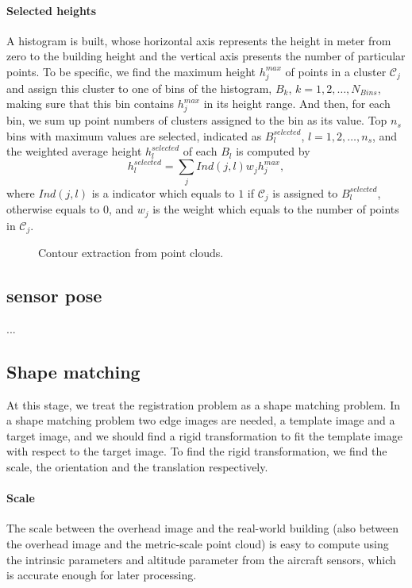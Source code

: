 \paragraph{Selected heights} A histogram is built, whose horizontal axis represents the height in meter from zero to the building height and the vertical axis presents the number of particular points. To be specific, we find the maximum height $h^{max}_j$ of points in a cluster $\mathcal{C}_j$ and assign this cluster to one of bins of the histogram, $B_k$, $k=1,2,\ldots,N_{Bins}$, making sure that this bin contains $h^{max}_j$ in its height range. And then, for each bin, we sum up point numbers of clusters assigned to the bin as its value. Top $n_{s}$ bins with maximum values are selected, indicated as $B^{selected}_l$, $l=1,2,\ldots,n_{s}$, and the weighted average height $h^{selected}_l$ of each $B_l$ is computed by
%
\begin{equation}
h^{selected}_l = \sum_jInd(j,l)w_jh^{max}_j,
\end{equation}
where $Ind(j,l)$ is a indicator which equals to $1$ if $\mathcal{C}_j$ is assigned to $B^{selected}_l$, otherwise equals to $0$, and $w_j$ is the weight which equals to the number of points in $\mathcal{C}_j$.
%
\begin{figure}
	\centering
	\vspace{3.0cm}
	\caption{Contour extraction from point clouds. }
\end{figure}
%
\subsection{sensor pose}
...
%
\subsection{Shape matching}
At this stage, we treat the registration problem as a shape matching problem. In a shape matching problem two edge images are needed, a template image and a target image, and we should find a rigid transformation to fit the template image with respect to  the target image. To find the rigid transformation, we find the scale, the orientation and the translation respectively. 
%
\paragraph{Scale}The scale between the overhead image and the real-world building (also between the overhead image and the metric-scale point cloud) is easy to compute using the intrinsic parameters and altitude parameter from the aircraft sensors, which is accurate enough for later processing. 
%
